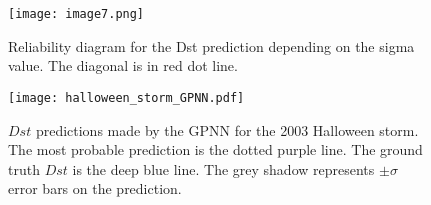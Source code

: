 



\begin{figure}
	\texttt{[image: image7.png]}
	\caption{Reliability diagram for the Dst prediction depending on the sigma value. The diagonal is in red dot line.}
	\label{fig:gpnnreliabilitysigma}	
\end{figure}




\begin{figure}
	\texttt{[image: halloween\_storm\_GPNN.pdf]}
	\caption{$Dst$ predictions made by the GPNN for the 2003 Halloween storm. 
	The most probable prediction is the dotted purple line. 
	The ground truth $Dst$ is the deep blue line. 
	The grey shadow represents $\pm\sigma$ error bars on the prediction.}
    \label{fig:gpnnhalloween}
\end{figure}




